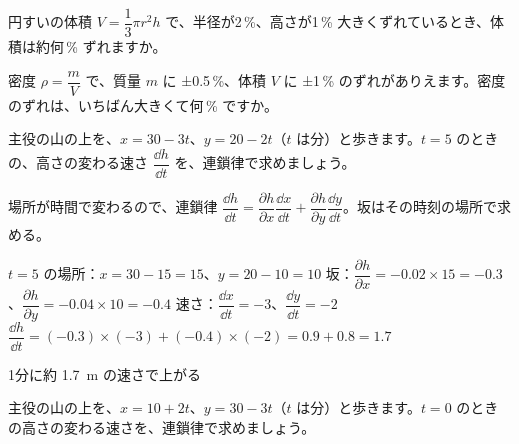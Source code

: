 \noindent\begin{minipage}[t]{0.49\linewidth}
\begin{jibun}
円すいの体積 $V=\dfrac{1}{3}\pi r^2h$ で、半径が2\,\%、高さが1\,\% 大きくずれているとき、体積は約何\,\% ずれますか。
\end{jibun}
\end{minipage}\hfill
\begin{minipage}[t]{0.49\linewidth}
\begin{jibun}
密度 $\rho=\dfrac{m}{V}$ で、質量 $m$ に ±0.5\,\%、体積 $V$ に ±1\,\% のずれがありえます。密度のずれは、いちばん大きくて何\,\% ですか。
\end{jibun}
\end{minipage}\par

\begin{reidai}
主役の山の上を、$x=30-3t$、$y=20-2t$（$t$ は分）と歩きます。$t=5$ のときの、高さの変わる速さ $\dfrac{\dd h}{\dd t}$ を、連鎖律で求めましょう。\par
\kangaekata 場所が時間で変わるので、連鎖律 $\dfrac{\dd h}{\dd t}=\dfrac{\partial h}{\partial x}\dfrac{\dd x}{\dd t}+\dfrac{\partial h}{\partial y}\dfrac{\dd y}{\dd t}$。坂はその時刻の場所で求める。\par
\shiki $t=5$ の場所：$x=30-15=15$、$y=20-10=10$\kviiidq
坂：$\dfrac{\partial h}{\partial x}=-0.02\times15=-0.3$、$\dfrac{\partial h}{\partial y}=-0.04\times10=-0.4$\kviiidq
速さ：$\dfrac{\dd x}{\dd t}=-3$、$\dfrac{\dd y}{\dd t}=-2$\kviiidq
$\dfrac{\dd h}{\dd t}=(-0.3)\times(-3)+(-0.4)\times(-2)=0.9+0.8=1.7$\par
\kotae 1分に約 \qty{1.7}{m} の速さで上がる
\end{reidai}

\begin{jibun}
主役の山の上を、$x=10+2t$、$y=30-3t$（$t$ は分）と歩きます。$t=0$ のときの高さの変わる速さを、連鎖律で求めましょう。
\end{jibun}

